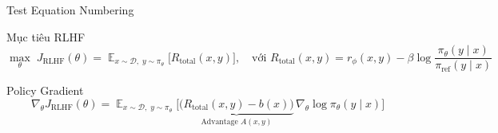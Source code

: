 \documentclass[11pt,aspectratio=169]{beamer}
\DeclareMathOperator{\E}{\mathbb{E}}
\begin{document}
\begin{frame}{Test Equation Numbering}
  \begin{block}{Mục tiêu RLHF}
    \begin{equation}
      \max_\theta \; J_{\text{RLHF}}(\theta) = \E_{x \sim \mathcal{D},\; y \sim \pi_\theta} \big[ R_{\text{total}}(x, y) \big], \quad \text{với } R_{\text{total}}(x, y) = r_\phi(x, y) - \beta \log \frac{\pi_\theta(y \mid x)}{\pi_{\text{ref}}(y \mid x)} \tag{1}
    \end{equation}
  \end{block}
  \begin{block}{Policy Gradient}
    \begin{equation}
      \nabla_\theta J_{\text{RLHF}}(\theta) = \E_{x \sim \mathcal{D},\; y \sim \pi_\theta} \Big[ \underbrace{\big(R_{\text{total}}(x, y) - b(x)\big)}_{\text{Advantage } A(x, y)} \, \nabla_\theta \log \pi_\theta(y \mid x) \Big] \tag{2}
    \end{equation}
  \end{block}
\end{frame}
\end{document}
